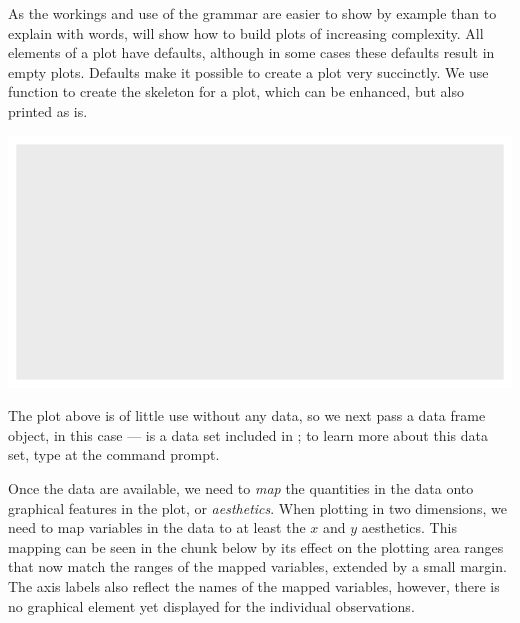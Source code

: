\documentclass[krantz2]{krantz}\usepackage{knitr}
\begin{document}
As the workings and use of the grammar are easier to show by example than to explain with words, will show how to build plots of increasing complexity. All elements of a plot have defaults, although in some cases these defaults result in empty plots. Defaults make it possible to create a plot very succinctly. We use function  to create the skeleton for a plot, which can be enhanced, but also printed as is.

\begin{knitrout}\footnotesize
{}\color{fgcolor}\begin{kframe}
\begin{alltt}
\hlstd{()}
\end{alltt}
\end{kframe}

{\centering \includegraphics[width=.7\textwidth]{figure/pos-ggplot-basics-01-1} 

}


\end{knitrout}

The plot above is of little use without any data, so we next pass a data frame object, in this case --- is a data set included in \Rlang; to learn more about this data set, type  at the \Rlang command prompt.

\begin{knitrout}\footnotesize
{}\color{fgcolor}\begin{kframe}
\begin{alltt}
\hlstd{(} 
\end{alltt}
\end{kframe}
\end{knitrout}

Once the data are available, we need to \emph{map} the quantities in the data onto graphical features in the plot, or \emph{aesthetics}. When plotting in two dimensions, we need to map variables in the data to at least the $x$ and $y$ aesthetics. This mapping can be seen in the chunk below by its effect on the plotting area ranges that now match the ranges of the mapped variables, extended by a small margin. The axis labels also reflect the names of the mapped variables, however, there is no graphical element yet displayed for the individual observations.
\end{document}
